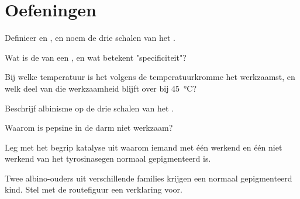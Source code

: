 \section{Oefeningen}

\begin{exercise}[$\star$]\label{exo:g11:enzymes-and-phenotype:1}
Definieer  en , en noem de drie schalen van het .
\end{exercise}

\begin{exercise}[$\star$]\label{exo:g11:enzymes-and-phenotype:2}
Wat is de  van een , en wat betekent "specificiteit"?
\end{exercise}

\begin{exercise}[$\star$]\label{exo:g11:enzymes-and-phenotype:3}
Bij welke temperatuur is het  volgens de temperatuurkromme het
werkzaamst, en welk deel van die werkzaamheid blijft over bij
\qty{45}{\celsius}?
\end{exercise}

\begin{exercise}[$\star$]\label{exo:g11:enzymes-and-phenotype:4}
Beschrijf albinisme op de drie schalen van het .
\end{exercise}

\begin{exercise}[$\star$]\label{exo:g11:enzymes-and-phenotype:5}
Waarom is pepsine in de darm niet werkzaam?
\end{exercise}

\begin{exercise}[$\star\star$]\label{exo:g11:enzymes-and-phenotype:6}
Leg met het begrip katalyse uit waarom iemand met één werkend en één niet
werkend  van het tyrosinasegen normaal gepigmenteerd is.
\end{exercise}

\begin{exercise}[$\star\star$]\label{exo:g11:enzymes-and-phenotype:7}
Twee albino-ouders uit verschillende families krijgen een normaal
gepigmenteerd kind. Stel met de routefiguur een verklaring voor.
\end{exercise}

